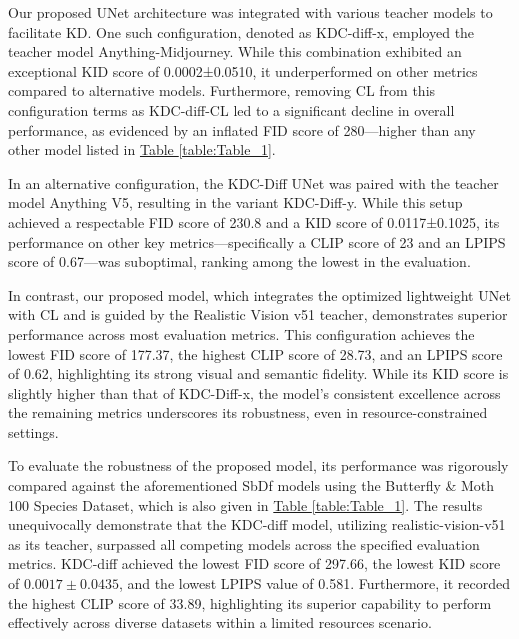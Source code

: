 \documentclass[a4paper,fleqn]{ieeetj}
\begin{document}
Our proposed UNet architecture was integrated with various teacher models to facilitate KD. One such configuration, denoted as KDC-diff-x, employed the teacher model Anything-Midjourney. While this combination exhibited an exceptional KID score of 0.0002±0.0510, it underperformed on other metrics compared to alternative models. Furthermore, removing CL from this configuration terms as KDC-diff-CL led to a significant decline in overall performance, as evidenced by an inflated FID score of 280—higher than any other model listed in  \hyperref[table:Table_1]{Table \ref*{table:Table_1}}.

In an alternative configuration, the KDC-Diff UNet was paired with the teacher model Anything V5, resulting in the variant KDC-Diff-y. While this setup achieved a respectable FID score of 230.8 and a KID score of 0.0117±0.1025, its performance on other key metrics—specifically a CLIP score of 23 and an LPIPS score of 0.67—was suboptimal, ranking among the lowest in the evaluation.

In contrast, our proposed model, which integrates the optimized lightweight UNet with CL and is guided by the Realistic Vision v51 teacher, demonstrates superior performance across most evaluation metrics. This configuration achieves the lowest FID score of 177.37, the highest CLIP score of 28.73, and an LPIPS score of 0.62, highlighting its strong visual and semantic fidelity. While its KID score is slightly higher than that of KDC-Diff-x, the model’s consistent excellence across the remaining metrics underscores its robustness, even in resource-constrained settings.

To evaluate the robustness of the proposed model, its performance was rigorously compared against the aforementioned SbDf models using the Butterfly \& Moth 100 Species Dataset, which is also given in  \hyperref[table:Table_1]{Table \ref*{table:Table_1}}. The results unequivocally demonstrate that the KDC-diff model, utilizing realistic-vision-v51 as its teacher, surpassed all competing models across the specified evaluation metrics. KDC-diff achieved the lowest FID score of 297.66, the lowest KID score of \(0.0017 \pm 0.0435\), and the lowest LPIPS value of 0.581. Furthermore, it recorded the highest CLIP score of 33.89, highlighting its superior capability to perform effectively across diverse datasets within a limited resources scenario.
\end{document}
